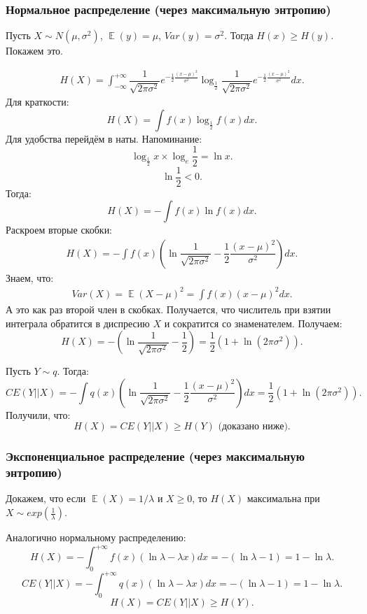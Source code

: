 \documentclass[10pt, a4paper]{extarticle}
\DeclareMathOperator{\E}{\mathbb{E}}
\begin{document}
\subsubsection{Нормальное распределение (через максимальную энтропию)}

Пусть $X \sim N(\mu, \sigma^2)$, $\E(y) = \mu$, $Var(y) = \sigma^2$. Тогда $H(x) \ge H(y)$. Покажем это.

\begin{align*}
	H(X) = \int_{-\infty}^{+\infty}\dfrac{1}{\sqrt{2\pi \sigma^2}}e^{-\frac{1}{2}\frac{(x-\mu)^2}{\sigma^2}} \log_{\frac{1}{2}} \dfrac{1}{\sqrt{2\pi \sigma^2}}e^{-\frac{1}{2}\frac{(x-\mu)^2}{\sigma^2}}dx.
\end{align*}
Для краткости:
\[
H(X) = \int f(x) \log_{\frac{1}{2}} f(x)dx.
\]
Для удобства перейдём в наты. Напоминание:
\[
\log_{\frac{1}{2}}x \times \log_{e}\frac{1}{2} = \ln x.
\]
\[
\ln \frac{1}{2} < 0.
\]
Тогда:
\[
H(X) = -\int f(x) \ln f(x)dx.
\]
Раскроем вторые скобки:
\begin{align*}
	H(X) = -\int f(x) \left( \ln \dfrac{1}{\sqrt{2\pi\sigma^2}} - \dfrac{1}{2}\dfrac{(x-\mu)^2}{\sigma^2} \right)dx.
\end{align*}
Знаем, что:
\begin{align*}
	Var(X) = \E(X-\mu)^2 = \int f(x)(x-\mu)^2dx.
\end{align*}
А это как раз второй член в скобках. Получается, что числитель при взятии интеграла обратится в диспресию $X$ и сократится со знаменателем. Получаем:
\[
H(X) = - \left( \ln \dfrac{1}{\sqrt{2\pi\sigma^2}} - \dfrac{1}{2} \right) = \dfrac{1}{2} \left(1 + \ln(2\pi\sigma^2)\right).
\]

Пусть $Y \sim q$. Тогда:
\[
CE(Y||X) = -\int q(x) \left( \ln \dfrac{1}{\sqrt{2\pi\sigma^2}} - \dfrac{1}{2}\dfrac{(x-\mu)^2}{\sigma^2} \right)dx = \dfrac{1}{2} \left(1 + \ln(2\pi\sigma^2)\right).
\]
Получили, что:
\[
H(X) = CE(Y||X) \ge H(Y) \text{ (доказано ниже).}
\]

\subsubsection{Экспоненциальное распределение (через максимальную энтропию)}

Докажем, что если $\E(X) = 1/\lambda$ и $X \ge 0$, то $H(X)$ максимальна при $X \sim exp(\frac{1}{\lambda})$.

Аналогично нормальному распределению:
\[
H(X) = - \int_{0}^{+\infty} f(x)(\ln\lambda - \lambda x)dx = -(\ln \lambda - 1) = 1 - \ln \lambda.
\]
\[
CE(Y||X) = - \int_{0}^{+\infty} q(x)(\ln\lambda - \lambda x)dx = -(\ln \lambda - 1) = 1 - \ln \lambda.
\]
\[
H(X) = CE(Y||X) \ge H(Y).
\]
\end{document}
